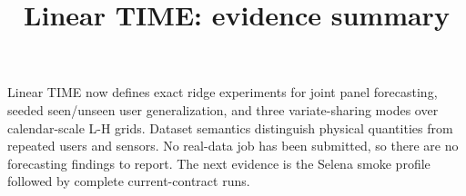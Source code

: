 \documentclass[11pt]{article}
\title{Linear TIME: evidence summary}
\author{}\date{}
\begin{document}
\maketitle
Linear TIME now defines exact ridge experiments for joint panel forecasting,
seeded seen/unseen user generalization, and three variate-sharing modes over
calendar-scale L-H grids. Dataset semantics distinguish physical quantities
from repeated users and sensors. No real-data job has been submitted, so there
are no forecasting findings to report. The next evidence is the Selena smoke
profile followed by complete current-contract runs.
\end{document}
